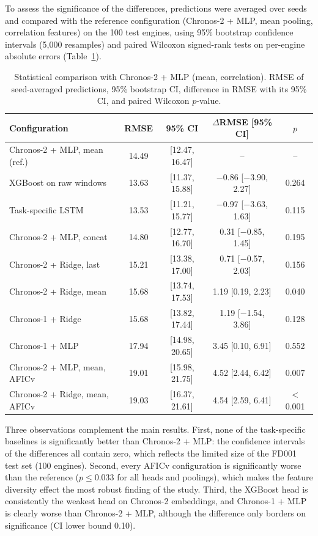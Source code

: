 \documentclass{svproc}
\begin{document}
To assess the significance of the differences, predictions were averaged
over seeds and compared with the reference configuration (Chronos-2 + MLP,
mean pooling, correlation features) on the 100 test engines, using 95\%
bootstrap confidence intervals (5,000 resamples) and paired Wilcoxon
signed-rank tests on per-engine absolute errors (Table~\ref{tab:stats}).

\begin{table}[h]
\caption{Statistical comparison with Chronos-2 + MLP (mean, correlation).
RMSE of seed-averaged predictions, 95\% bootstrap CI, difference in RMSE
with its 95\% CI, and paired Wilcoxon $p$-value.}
\label{tab:stats}
\centering\small
\begin{tabular}{@{}lcccc@{}}
\toprule
\textbf{Configuration} & \textbf{RMSE} & \textbf{95\% CI} & \textbf{$\Delta$RMSE [95\% CI]} & \textbf{$p$} \\
\midrule
Chronos-2 + MLP, mean (ref.)   & 14.49 & [12.47, 16.47] & -- & -- \\
XGBoost on raw windows         & 13.63 & [11.37, 15.88] & $-$0.86 [$-$3.90, 2.27] & 0.264 \\
Task-specific LSTM             & 13.53 & [11.21, 15.77] & $-$0.97 [$-$3.63, 1.63] & 0.115 \\
Chronos-2 + MLP, concat        & 14.80 & [12.77, 16.70] & 0.31 [$-$0.85, 1.45] & 0.195 \\
Chronos-2 + Ridge, last        & 15.21 & [13.38, 17.00] & 0.71 [$-$0.57, 2.03] & 0.156 \\
Chronos-2 + Ridge, mean        & 15.68 & [13.74, 17.53] & 1.19 [0.19, 2.23] & 0.040 \\
Chronos-1 + Ridge              & 15.68 & [13.82, 17.44] & 1.19 [$-$1.54, 3.86] & 0.128 \\
Chronos-1 + MLP                & 17.94 & [14.98, 20.65] & 3.45 [0.10, 6.91] & 0.552 \\
Chronos-2 + MLP, mean, AFICv   & 19.01 & [15.98, 21.75] & 4.52 [2.44, 6.42] & 0.007 \\
Chronos-2 + Ridge, mean, AFICv & 19.03 & [16.37, 21.61] & 4.54 [2.59, 6.41] & $<$0.001 \\
\bottomrule
\end{tabular}
\end{table}

Three observations complement the main results. First, none of the
task-specific baselines is significantly better than Chronos-2 + MLP: the
confidence intervals of the differences all contain zero, which reflects
the limited size of the FD001 test set (100 engines). Second, every AFICv
configuration is significantly worse than the reference ($p \le 0.033$ for
all heads and poolings), which makes the feature diversity effect the most
robust finding of the study. Third, the XGBoost head is consistently the
weakest head on Chronos-2 embeddings, and Chronos-1 + MLP is clearly worse
than Chronos-2 + MLP, although the difference only borders on
significance (CI lower bound 0.10).
\end{document}
